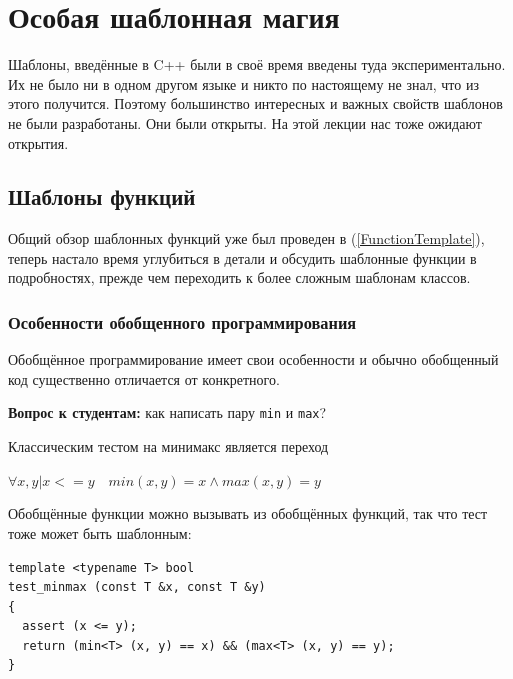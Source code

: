 \documentclass[a4paper,12pt,oneside]{article}
\newif\ifanswers
\begin{document}
\pagebreak
\section{Особая шаблонная магия}

Шаблоны, введённые в C++ были в своё время введены туда экспериментально. Их не было ни в одном другом языке и никто по настоящему не знал, что из этого получится. Поэтому большинство интересных и важных свойств шаблонов не были разработаны. Они были открыты. На этой лекции нас тоже ожидают открытия.

\subsection{Шаблоны функций}\label{FunctionTemplates}

Общий обзор шаблонных функций уже был проведен в (\ref{FunctionTemplate}), теперь настало время углубиться в детали и обсудить шаблонные функции в подробностях, прежде чем переходить к более сложным шаблонам классов.

\subsubsection{Особенности обобщенного программирования}\label{GenericCode}

Обобщённое программирование имеет свои особенности и обычно обобщенный код существенно отличается от конкретного.

\textbf{Вопрос к студентам:} как написать пару \lstinline!min! и \lstinline!max!?

\ifanswers
Возможный вариант ответа:

\begin{lstlisting}
template <class T> const T&
max (const T &x, const T &y)
{
  return ((x > y) ? x : y);
}

template <class T> const T&
min (const T &x, const T &y)
{
  return ((x < y) ? x : y);
}
\end{lstlisting}
\fi

Классическим тестом на минимакс является переход 

$\forall x, y | x <= y \quad min(x,y) = x \wedge max(x, y) = y$

Обобщённые функции можно вызывать из обобщённых функций, так что тест тоже может быть шаблонным:

\begin{lstlisting}
template <typename T> bool
test_minmax (const T &x, const T &y)
{
  assert (x <= y);
  return (min<T> (x, y) == x) && (max<T> (x, y) == y);
}

\end{lstlisting}
\end{document}
